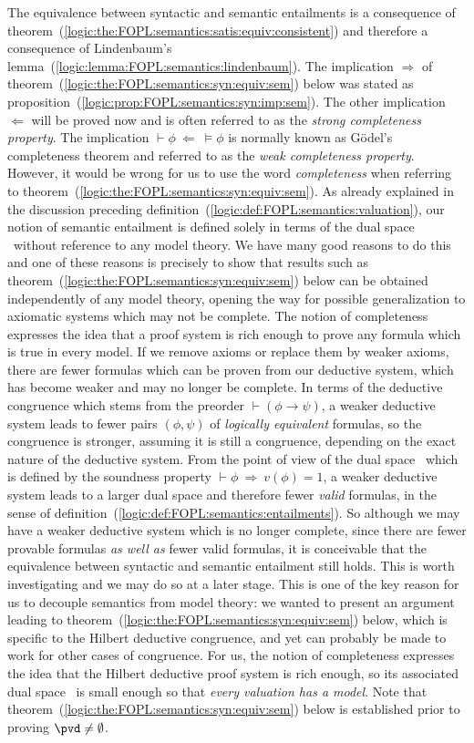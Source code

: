 The equivalence between syntactic and semantic entailments is a
consequence of
theorem~(\ref{logic:the:FOPL:semantics:satis:equiv:consistent}) and
therefore a consequence of Lindenbaum's
lemma~(\ref{logic:lemma:FOPL:semantics:lindenbaum}). The implication
$\Rightarrow$ of
theorem~(\ref{logic:the:FOPL:semantics:syn:equiv:sem}) below was
stated as proposition~(\ref{logic:prop:FOPL:semantics:syn:imp:sem}).
The other implication $\Leftarrow$ will be proved now and is often
referred to as the {\em strong completeness property}. The
implication $\vdash\phi\ \Leftarrow\ \vDash\phi$ is normally known
as G\"odel's completeness theorem and referred to as the {\em weak
completeness property}. However, it would be wrong for us to use the
word {\em completeness} when referring to
theorem~(\ref{logic:the:FOPL:semantics:syn:equiv:sem}). As already
explained in the discussion preceding
definition~(\ref{logic:def:FOPL:semantics:valuation}), our notion of
semantic entailment is defined solely in terms of the dual space
\pvd\ without reference to any model theory. We have many good
reasons to do this and one of these reasons is precisely to show
that results such as
theorem~(\ref{logic:the:FOPL:semantics:syn:equiv:sem}) below can be
obtained independently of any model theory, opening the way for
possible generalization to axiomatic systems which may not be
complete. The notion of completeness expresses the idea that a proof
system is rich enough to prove any formula which is true in every
model. If we remove axioms or replace them by weaker axioms, there
are fewer formulas which can be proven from our deductive system,
which has become weaker and may no longer be complete. In terms of
the deductive congruence which stems from the preorder
$\vdash(\phi\to\psi)$, a weaker deductive system leads to fewer
pairs $(\phi,\psi)$ of {\em logically equivalent} formulas, so the
congruence is stronger, assuming it is still a congruence, depending
on the exact nature of the deductive system. From the point of view
of the dual space \pvd\ which is defined by the soundness property
$\vdash\phi\ \Rightarrow\ v(\phi)=1$, a weaker deductive system
leads to a larger dual space and therefore fewer {\em valid}
formulas, in the sense of
definition~(\ref{logic:def:FOPL:semantics:entailments}). So although
we may have a weaker deductive system which is no longer complete,
since there are fewer provable formulas {\em as well as} fewer valid
formulas, it is conceivable that the equivalence between syntactic
and semantic entailment still holds. This is worth investigating and
we may do so at a later stage. This is one of the key reason for us
to decouple semantics from model theory: we wanted to present an
argument leading to
theorem~(\ref{logic:the:FOPL:semantics:syn:equiv:sem}) below, which
is specific to the Hilbert deductive congruence, and yet can
probably be made to work for other cases of congruence. For us, the
notion of completeness expresses the idea that the Hilbert deductive
proof system is rich enough, so its associated dual space \pvd\ is
small enough so that {\em every valuation has a model}. Note that
theorem~(\ref{logic:the:FOPL:semantics:syn:equiv:sem}) below is
established prior to proving $\pvd\neq\emptyset$.

